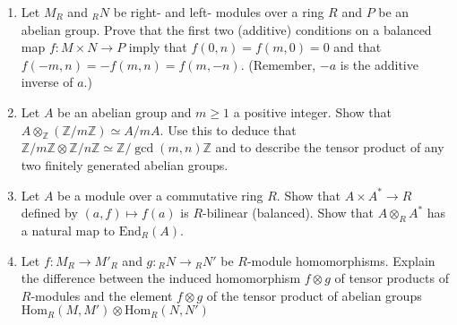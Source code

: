 \documentclass[12pt]{article}
\newcommand{\ZZ}{{\mathbb Z}}
\newcommand{\Hom}{\mbox{Hom}}
\newcommand{\End}{\mbox{End}}
\begin{document}
\begin{enumerate}

\item  Let $M_R$ and $_RN$ be right- and left- modules over a ring $R$ and $P$ be an abelian group.\newline
  Prove that the first two (additive) conditions on a balanced map $f\colon M\times N \to P$ imply that\newline
  $f(0,n)=f(m,0)=0$ and that $f(-m,n)=-f(m,n)=f(m,-n)$. \newline
  (Remember, $-a$ is the additive inverse of $a$.)
   \vspace{-2pt}


 \item
   Let $A$ be an abelian group and $m\geq 1$ a positive integer.
   Show that $A\otimes_\ZZ(\ZZ/m\ZZ) \simeq A/mA$.
   Use this to deduce that $\ZZ/m\ZZ\otimes\ZZ/n\ZZ\simeq \ZZ/\gcd(m,n)\ZZ$ and
   to describe the tensor product of any two finitely generated abelian groups.
   \vspace{-2pt}

\item  Let $A$ be a module over a commutative ring $R$.
    Show that $A\times A^* \to R$ defined by $(a,f)\mapsto f(a)$ is $R$-bilinear (balanced).
    Show that $A\otimes_R A^*$ has a natural map to $\End_R(A)$.
\vspace{-2pt}


 \item
   Let $f\colon M_R\to M'_R$ and $g\colon {_R}N\to{_R}N'$ be $R$-module homomorphisms.
   Explain the difference between the induced homomorphism $f\otimes g$ of tensor products of $R$-modules and the element $f\otimes g$
   of the tensor product of abelian groups $\Hom_R(M,M')\otimes\Hom_R(N,N')$
   \vspace{-2pt}


\end{enumerate}
\end{document}
